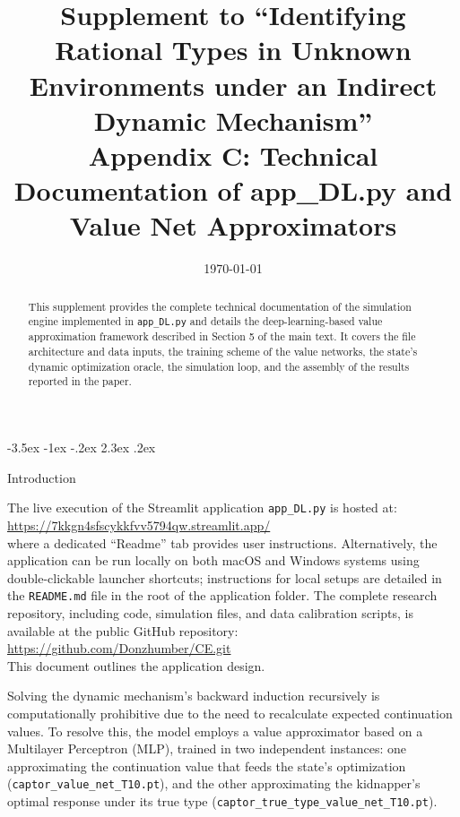 \documentclass[12pt]{article}
\makeatletter
\newcommand{\pyfile}[1]{\texttt{#1}}
\numberwithin{equation}{section}
\numberwithin{table}{section}
\renewcommand\section{\@startsection {section}{1}{\z@}%
                                   {-3.5ex \@plus -1ex \@minus -.2ex}%
                                   {2.3ex \@plus.2ex}%
                                   {\normalfont\Large\bfseries\raggedright}}
\makeatother
\begin{document}
\title{Supplement to ``Identifying Rational Types in Unknown Environments under an Indirect Dynamic Mechanism''\\
Appendix C: Technical Documentation of app\_DL.py and Value Net Approximators}
\author{}
\date{\today}
\maketitle

\begin{abstract}
\singlespacing
This supplement provides the complete technical documentation of the simulation engine implemented in \pyfile{app\_DL.py} and details the deep-learning-based value approximation framework described in Section 5 of the main text. It covers the file architecture and data inputs, the training scheme of the value networks, the state's dynamic optimization oracle, the simulation loop, and the assembly of the results reported in the paper.
\end{abstract}

\section{Introduction}

The live execution of the Streamlit application \pyfile{app\_DL.py} is hosted at:\\
\url{https://7kkgn4sfscykkfvv5794qw.streamlit.app/}\\
where a dedicated ``Readme'' tab provides user instructions. Alternatively, the application can be run locally on both macOS and Windows systems using double-clickable launcher shortcuts; instructions for local setups are detailed in the \texttt{README.md} file in the root of the application folder. The complete research repository, including code, simulation files, and data calibration scripts, is available at the public GitHub repository:\\
\url{https://github.com/Donzhumber/CE.git}\\
This document outlines the application design.

Solving the dynamic mechanism's backward induction recursively is computationally prohibitive due to the need to recalculate expected continuation values. To resolve this, the model employs a value approximator based on a Multilayer Perceptron (MLP), trained in two independent instances: one approximating the continuation value that feeds the state's optimization (\pyfile{captor\_value\_net\_T10.pt}), and the other approximating the kidnapper's optimal response under its true type (\pyfile{captor\_true\_type\_value\_net\_T10.pt}).
\end{document}
